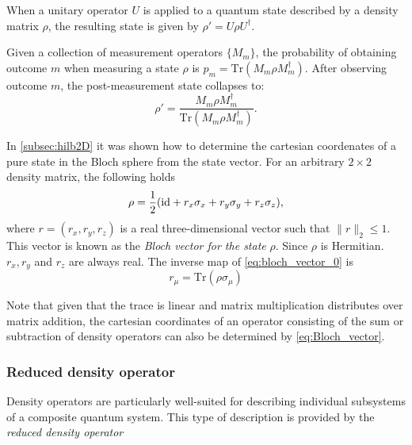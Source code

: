 \begin{definition}
  When a unitary operator \( U \) is applied to a quantum state described by a density matrix \( \rho \), the resulting state is given by $ \rho' = U \rho U^\dagger.$
\end{definition}

\begin{definition}
  Given a collection of measurement operators \( \{M_m\} \), the probability of obtaining outcome \( m \) when measuring a state \( \rho \) is $p_m = \text{Tr}(M_m \rho M_m^\dagger).$
  After observing outcome $ m $, the post-measurement state collapses to:
  \[
  \rho' = \frac{M_m \rho M_m^\dagger}{\text{Tr}(M_m \rho M_m^\dagger)}.
  \]
\end{definition}


\begin{definition}
  In \autoref{subsec:hilb2D} it was shown how to determine the cartesian coordenates of a pure state in the Bloch sphere from the state vector. For an arbitrary $2 \times 2$ density matrix, the following holds
\begin{equation} \label{eq:bloch_vector_0}
  \rho = \frac{1}{2}(\mathrm{id} + r_{x}\sigma_{x} + r_{y}\sigma_{y} + r_{z}\sigma_{z}),
\end{equation}
where $r = (r_x, r_y, r_z)$ is a real three-dimensional vector such that $\| r \|_2 \leq 1$. This vector is known as the \emph{Bloch vector for the state} $\rho$. Since $\rho$ is Hermitian. $r_x, r_y$ and $r_z$ are always real.  The inverse map of \autoref{eq:bloch_vector_0} is
\begin{equation}
  \label{eq:Bloch_vector}
  r_{\mu} = \text{Tr}(\rho \sigma_{\mu})
  \end{equation} 
\end{definition}


  Note that given that the trace is linear and matrix multiplication distributes over matrix addition, the cartesian coordinates of an operator consisting of the sum or subtraction of density operators can also be determined by \autoref{eq:Bloch_vector}.

\subsubsection{Reduced density operator}

Density operators are particularly well-suited for describing individual subsystems of a composite quantum system. This type of description is provided by the \emph{reduced density operator}

